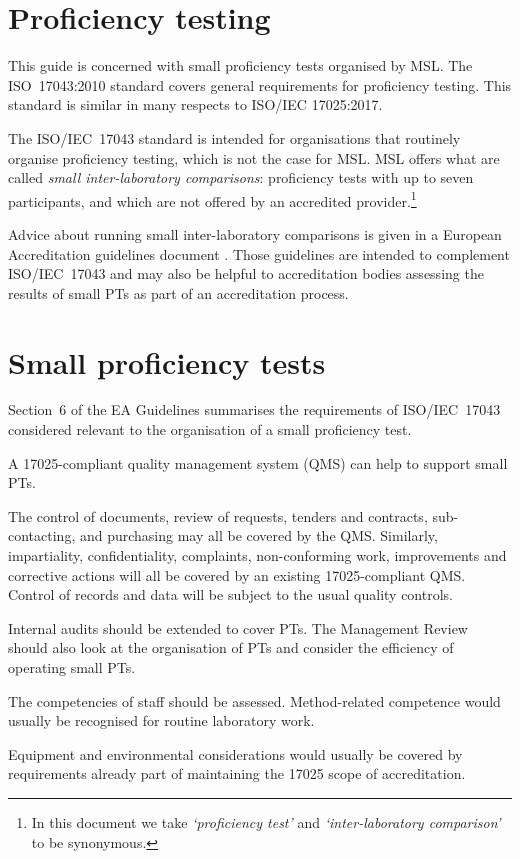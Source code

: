 \section{Proficiency testing}
This guide is concerned with small proficiency tests organised by MSL. The ISO~17043:2010 standard covers general requirements for proficiency testing. This standard is similar in many respects to ISO/IEC 17025:2017. 

The ISO/IEC~17043 standard is intended for organisations that routinely organise proficiency testing, which is not the case for MSL. MSL offers what are called \textit{small inter-laboratory comparisons}: proficiency tests with up to seven participants, and which are not offered by an accredited provider.\footnote{In this document we take \textit{`proficiency test'} and \textit{`inter-laboratory comparison'} to be synonymous.} 

Advice about running small inter-laboratory comparisons is given in a European Accreditation guidelines document \cite{EA-4/21}. Those guidelines are intended to complement ISO/IEC~17043 and may also be helpful to accreditation bodies assessing the results of small PTs as part of an accreditation process.

\section{Small proficiency tests}
Section~6 of the EA Guidelines \cite{EA-4/21} summarises the requirements of ISO/IEC~17043 considered relevant to the organisation of a small proficiency test.

A 17025-compliant quality management system (QMS) can help to support small PTs.

The control of documents, review of requests, tenders and contracts, sub-contacting, and purchasing may all be covered by the QMS. Similarly, impartiality, confidentiality, complaints, non-conforming work, improvements and corrective actions will all be covered by an existing 17025-compliant QMS. Control of records and data will be subject to the usual quality controls.

Internal audits should be extended to cover PTs. The Management Review should also look at the organisation of PTs and consider the efficiency of operating small PTs. 

The competencies of staff should be assessed. Method-related competence would usually be recognised for routine laboratory work.

Equipment and environmental considerations would usually be covered by requirements already part of maintaining the 17025 scope of accreditation.

